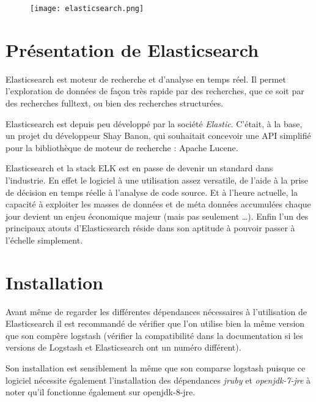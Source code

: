 
\begin{figure}[H]
\center
\texttt{[image: elasticsearch.png]}
\label{fig:elasticsearchlogo.png}
\end{figure}
\section{Présentation de Elasticsearch}
Elasticsearch est moteur de recherche et d'analyse en temps réel. Il permet l'exploration
de données de façon très rapide par des recherches, que ce soit par des recherches
\gls{fulltext}, ou bien des recherches structurées.

Elasticsearch est depuis peu développé par la société \emph{Elastic}. C'était, à 
la base, un projet du développeur Shay Banon, qui souhaitait concevoir une API simplifié
pour la bibliothèque de moteur de recherche : Apache Lucene.

Elasticsearch et la stack ELK est en passe de devenir un standard dans l'industrie.
En effet le logiciel à une utilisation assez versatile, de l'aide à la prise de 
décision en temps réelle à l'analyse de code source. Et à l'heure actuelle, la capacité 
à exploiter les masses de données et de méta données accumulées chaque jour devient 
un enjeu économique majeur (mais pas seulement \ldots). Enfin l'un des principaux 
atouts d'Elasticsearch réside dans son aptitude à pouvoir passer à l'échelle simplement.

\section{Installation}
Avant même de regarder les différentes dépendances nécessaires à l'utilisation de
Elasticsearch il est recommandé de vérifier que l'on utilise bien la même version
que son compère logstash (vérifier la compatibilité dans la documentation si les
versions de Logstash et Elasticsearch ont un numéro différent).

Son installation est sensiblement la même que son comparse logstash puisque ce logiciel 
nécessite également l'installation des dépendances \emph{jruby} et \emph{openjdk-7-jre}
à noter qu'il fonctionne également sur openjdk-8-jre.

